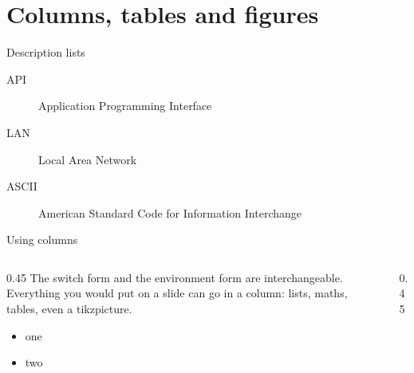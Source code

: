 \documentclass[aspectratio=169,11pt]{beamer}
\begin{document}
\section{Columns, tables and figures}

\begin{frame}{Description lists}
    \begin{description}
        \item[API]   Application Programming Interface
        \item[LAN]   Local Area Network
        \item[ASCII] American Standard Code for Information Interchange
    \end{description}
\end{frame}

\begin{frame}{Using columns}
    \begin{columns}[T]
        \begin{column}{0.45\textwidth}
            The switch form and the environment form are interchangeable.
            Everything you would put on a slide can go in a column: lists,
            maths, tables, even a tikzpicture.
            \begin{itemize}
                \item one
                \item two
            \end{itemize}
        \end{column}
        \begin{column}{0.45\textwidth}
        \end{column}
    \end{columns}
\end{frame}
\end{document}
